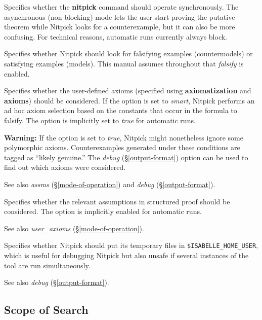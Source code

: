 \documentclass[a4paper,12pt]{article}
\begin{document}
\begin{enum}
Specifies whether the \textbf{nitpick} command should operate synchronously.
The asynchronous (non-blocking) mode lets the user start proving the putative
theorem while Nitpick looks for a counterexample, but it can also be more
confusing. For technical reasons, automatic runs currently always block.

Specifies whether Nitpick should look for falsifying examples (countermodels) or
satisfying examples (models). This manual assumes throughout that
\textit{falsify} is enabled.

Specifies whether the user-defined axioms (specified using 
\textbf{axiomatization} and \textbf{axioms}) should be considered. If the option
is set to \textit{smart}, Nitpick performs an ad hoc axiom selection based on
the constants that occur in the formula to falsify. The option is implicitly set
to \textit{true} for automatic runs.

\textbf{Warning:} If the option is set to \textit{true}, Nitpick might
nonetheless ignore some polymorphic axioms. Counterexamples generated under
these conditions are tagged as ``likely genuine.'' The \textit{debug}
(\S\ref{output-format}) option can be used to find out which axioms were
considered.

\nopagebreak
{\small See also \textit{assms} (\S\ref{mode-of-operation}) and \textit{debug}
(\S\ref{output-format}).}

Specifies whether the relevant assumptions in structured proof should be
considered. The option is implicitly enabled for automatic runs.

\nopagebreak
{\small See also \textit{user\_axioms} (\S\ref{mode-of-operation}).}

Specifies whether Nitpick should put its temporary files in
\texttt{\$ISABELLE\_\allowbreak HOME\_\allowbreak USER}, which is useful for
debugging Nitpick but also unsafe if several instances of the tool are run
simultaneously.

\nopagebreak
{\small See also \textit{debug} (\S\ref{output-format}).}
\end{enum}

\subsection{Scope of Search}
\label{scope-of-search}
\end{document}
